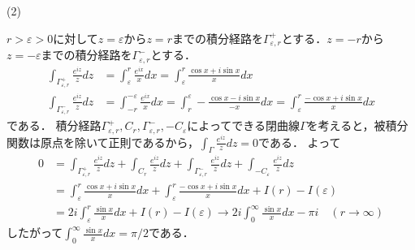 \documentclass[
		book,
		head_space=20mm,
		foot_space=20mm,
		gutter=10mm,
		line_length=190mm
]{jlreq}
\begin{document}
(2)

$r>\varepsilon>0$に対して$z=\varepsilon$から$z=r$までの積分経路を$\Gamma_{\varepsilon,r}^+$とする．$z=-r$から$z=-\varepsilon$までの積分経路を$\Gamma_{\varepsilon,r}^-$とする．
\begin{align}
	\int_{\Gamma_{\varepsilon,r}^+} \frac{e^{iz}}{z}dz&=\int_{\varepsilon}^r \frac{e^{ix}}{x}dx=\int_{\varepsilon}^r \frac{\cos x+i\sin x}{x}dx\\
	\int_{\Gamma_{\varepsilon,r}^-} \frac{e^{iz}}{z}dz&=\int_{-r}^{-\varepsilon} \frac{e^{ix}}{x}dx=\int_{r}^{\varepsilon} -\frac{\cos x-i\sin x}{-x}dx=\int_{\varepsilon}^r \frac{-\cos x+i\sin x}{x}dx
\end{align}である．
積分経路$\Gamma_{\varepsilon,r}^+,C_r,\Gamma_{\varepsilon,r}^-,-C_{\varepsilon}$によってできる閉曲線$\Gamma$を考えると，被積分関数は原点を除いて正則であるから，$\int_{\Gamma} \frac{e^{iz}}{z}dz=0$である．
よって
\begin{align}
	0&= \int_{\Gamma_{\varepsilon,r}^+} \frac{e^{iz}}{z}dz+\int_{C_r} \frac{e^{iz}}{z}dz+\int_{\Gamma_{\varepsilon,r}^-} \frac{e^{iz}}{z}dz+\int_{-C_{\varepsilon}} \frac{e^{iz}}{z}dz\\
	&=\int_{\varepsilon}^r \frac{\cos x+i\sin x}{x}dx+\int_{\varepsilon}^r \frac{-\cos x+i\sin x}{x}dx+I(r)-I(\varepsilon)\\
	&=2i\int_{\varepsilon}^r \frac{\sin x}{x}dx+I(r)-I(\varepsilon)\rightarrow 2 i \int_{0}^\infty \frac{\sin x}{x}dx -\pi i \quad (r\rightarrow \infty)
\end{align}
したがって$\int_0^\infty \frac{\sin x}{x}dx=\pi/2$である．
\end{document}
